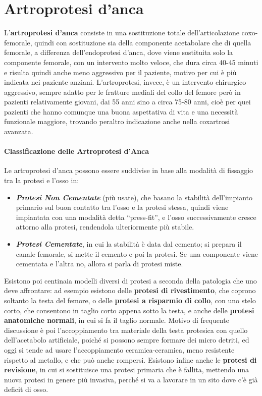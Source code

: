 \section{Artroprotesi d'anca}


L'\textbf{artroprotesi d'anca} consiste in una sostituzione totale
dell'articolazione coxo-femorale, quindi con sostituzione sia della
componente acetabolare che di quella femorale, a differenza
dell'endoprotesi d'anca, dove viene sostituita solo la componente
femorale, con un intervento molto veloce, che dura circa 40-45 minuti e
risulta quindi anche meno aggressivo per il paziente, motivo per cui è
più indicata nei paziente anziani. L'artroprotesi, invece, è un
intervento chirurgico aggressivo, sempre adatto per le fratture mediali
del collo del femore però in pazienti relativamente giovani, dai 55 anni
sino a circa 75-80 anni, cioè per quei pazienti che hanno comunque una
buona aspettativa di vita e una necessità funzionale maggiore, trovando
peraltro indicazione anche nella coxartrosi avanzata.

\paragraph{Classificazione delle Artroprotesi d'Anca}


Le artroprotesi d'anca possono essere suddivise in base alla modalità di
fissaggio tra la protesi e l'osso in:

\begin{itemize}
\item
  \textbf{\emph{Protesi Non Cementate}} (più usate), che basano la
  stabilità dell'impianto primario sul buon contatto tra l'osso e la
  protesi stessa, quindi viene impiantata con una modalità detta
  ``press-fit'', e l'osso successivamente cresce attorno alla protesi,
  rendendola ulteriormente più stabile.
\item
  \textbf{\emph{Protesi Cementate}}, in cui la stabilità è data dal
  cemento; si prepara il canale femorale, si mette il cemento e poi la
  protesi. Se una componente viene cementata e l'altra no, allora si
  parla di protesi miste.
\end{itemize}

Esistono poi centinaia modelli diversi di protesi a seconda della
patologia che uno deve affrontare: ad esempio esistono delle
\textbf{protesi di rivestimento}, che coprono soltanto la testa del
femore, o delle \textbf{protesi a risparmio di collo}, con uno stelo
corto, che consentono in taglio corto appena sotto la testa, e anche
delle \textbf{protesi anatomiche normali}, in cui si fa il taglio
normale. Motivo di frequente discussione è poi l'accoppiamento tra
materiale della testa protesica con quello dell'acetabolo artificiale,
poiché si possono sempre formare dei micro detriti, ed oggi si tende ad
usare l'accoppiamento ceramica-ceramica, meno resistente rispetto al
metallo, e che può anche rompersi. Esistono infine anche le
\textbf{protesi di revisione}, in cui si sostituisce una protesi
primaria che è fallita, mettendo una nuova protesi in genere più
invasiva, perché si va a lavorare in un sito dove c'è già deficit di
osso.

